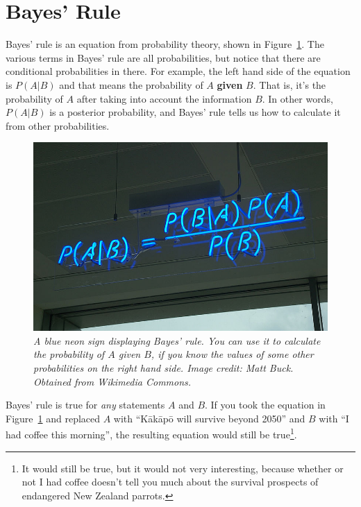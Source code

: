 \section{Bayes' Rule}
Bayes' rule is an equation from probability theory, shown in
Figure~\ref{fig:bayes_neon}. The various terms in Bayes' rule are all
probabilities, but notice that there are conditional probabilities in there.
For example, the left hand side of the equation is $P(A|B)$ and that means
the probability of $A$ {\bf given} $B$. That is, it's the probability of $A$
after taking into account the information $B$. In other words,
$P(A|B)$ is a posterior probability, and Bayes' rule tells us how to calculate
it from other probabilities.
\begin{figure}[!ht]
\begin{center}
\includegraphics[scale=0.4]{Figures/bayes_neon.jpg}
\caption{\it A blue neon sign displaying Bayes' rule.
You can use it to calculate the probability of $A$ {\it given} $B$,
if you know the values of some other probabilities on the right hand side.
Image credit: Matt Buck. Obtained from Wikimedia Commons.
\label{fig:bayes_neon}}
\end{center}
\end{figure}
Bayes' rule is true for {\it any} statements $A$ and $B$. If you took the
equation in Figure~\ref{fig:bayes_neon} and replaced $A$ with
``K\={a}k\={a}p\={o} will survive beyond 2050'' and $B$ with
``I had coffee this morning'', the
resulting equation would still be true\footnote{It would still be true, but
it would not very interesting,
because
whether or not I had coffee doesn't tell you much about the survival prospects
of endangered New Zealand parrots.}.

